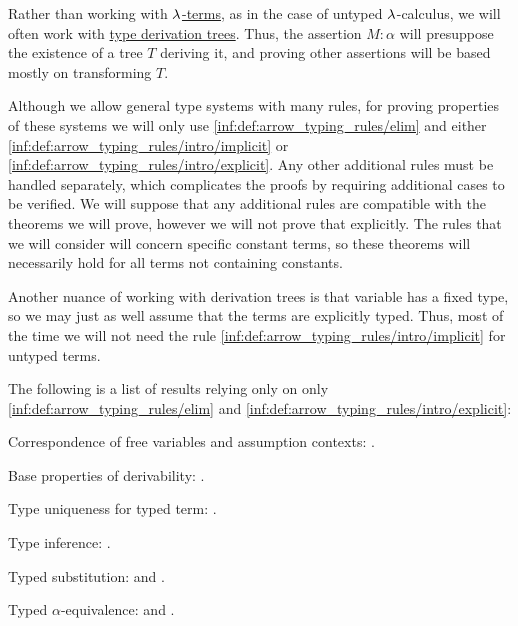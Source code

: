 \begin{remark}\label{rem:arrow_typing_rules_only}
  Rather than working with \hyperref[def:lambda_term]{\( \mathrm{\lambda} \)-terms}, as in the case of untyped \( \mathrm{\lambda} \)-calculus, we will often work with \hyperref[def:type_derivation_tree]{type derivation trees}. Thus, the assertion \( M: \alpha \) will presuppose the existence of a tree \( T \) deriving it, and proving other assertions will be based mostly on transforming \( T \).

  Although we allow general type systems with many rules, for proving properties of these systems we will only use \ref{inf:def:arrow_typing_rules/elim} and either \ref{inf:def:arrow_typing_rules/intro/implicit} or \ref{inf:def:arrow_typing_rules/intro/explicit}. Any other additional rules must be handled separately, which complicates the proofs by requiring additional cases to be verified. We will suppose that any additional rules are compatible with the theorems we will prove, however we will not prove that explicitly. The rules that we will consider will concern specific constant terms, so these theorems will necessarily hold for all terms not containing constants.

  Another nuance of working with derivation trees is that variable has a fixed type, so we may just as well assume that the terms are explicitly typed. Thus, most of the time we will not need the rule \ref{inf:def:arrow_typing_rules/intro/implicit} for untyped terms.

  The following is a list of results relying only on only \ref{inf:def:arrow_typing_rules/elim} and \ref{inf:def:arrow_typing_rules/intro/explicit}:
  \begin{thmenum}
     Correspondence of free variables and assumption contexts: .

     Base properties of derivability: .

     Type uniqueness for typed term: .

     Type inference: .

     Typed substitution:  and .

     Typed \( \alpha \)-equivalence:  and .
  \end{thmenum}
\end{remark}


